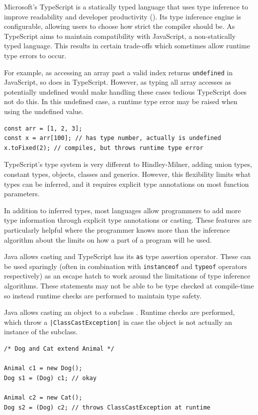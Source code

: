 \documentclass[a4paper,fleqn,oneside,12pt]{report}
\begin{document}
Microsoft's TypeScript is a statically typed language that uses type inference to improve readability and developer productivity (\cite{ref36}). Its type inference engine is configurable, allowing users to choose how strict the compiler should be. As TypeScript aims to maintain compatibility with JavaScript, a non-statically typed language. This results in certain trade-offs which sometimes allow runtime type errors to occur.

For example, as accessing an array past a valid index returns \texttt{undefined} in JavaScript, so does in TypeScript. However, as typing all array accesses as potentially undefined would make handling these cases tedious TypeScript does not do this. In this undefined case, a runtime type error may be raised when using the undefined value.

\begin{verbatim}
const arr = [1, 2, 3];
const x = arr[100]; // has type number, actually is undefined
x.toFixed(2); // compiles, but throws runtime type error
\end{verbatim}

TypeScript's type system is very different to Hindley-Milner, adding union types, constant types, objects, classes and generics. However, this flexibility limits what types can be inferred, and it requires explicit type annotations on most function parameters.

In addition to inferred types, most languages allow programmers to add more type information through explicit type annotations or casting. These features are particularly helpful where the programmer knows more than the inference algorithm about the limits on how a part of a program will be used.

Java allows casting and TypeScript has its \texttt{as} type assertion operator. These can be used sparingly (often in combination with \texttt{instanceof} and \texttt{typeof} operators respectively) as an escape hatch to work around the limitations of type inference algorithms. These statements may not be able to be type checked at compile-time so instead runtime checks are performed to maintain type safety.

Java allows casting an object to a subclass \citep{ref25}. Runtime checks are performed, which throw a \texttt{|ClassCastException|} in case the object is not actually an instance of the subclass.

\begin{verbatim}
/* Dog and Cat extend Animal */

Animal c1 = new Dog();
Dog s1 = (Dog) c1; // okay

Animal c2 = new Cat();
Dog s2 = (Dog) c2; // throws ClassCastException at runtime
\end{verbatim}
\end{document}
